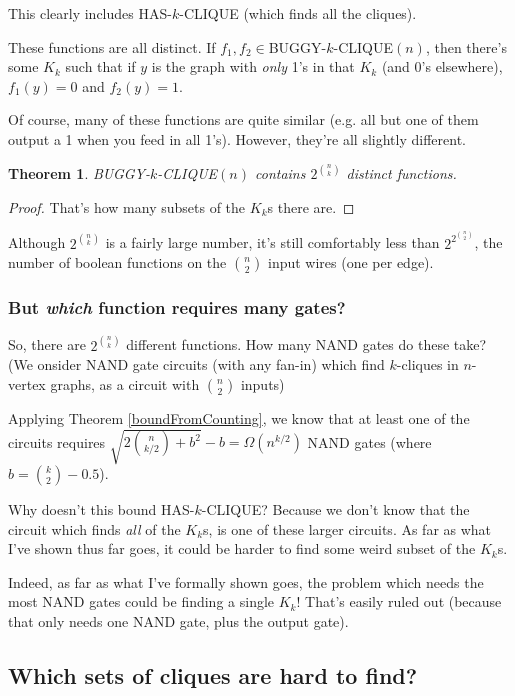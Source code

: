 \documentclass[12pt]{article}
\newtheorem{thm}{Theorem}[section]
\theoremstyle{definition}
\begin{document}
This clearly includes HAS-$k$-CLIQUE (which finds all the cliques).

These functions are all distinct. If $f_1,f_2\in $BUGGY-$k$-CLIQUE$(n)$,
then there's some $K_k$ such that if $y$ is the graph with {\em only}
1's in that $K_k$ (and 0's elsewhere), $f_1(y) = 0$ and $f_2(y) = 1$.

Of course, many of these functions are quite similar (e.g. all but one of them
output a 1 when you feed in all 1's). However, they're all slightly different.

\begin{thm}
\label{buggyDistinct}
BUGGY-$k$-CLIQUE$(n)$ contains $2^{n \choose k}$ distinct functions.
\end{thm}
\begin{proof}
That's how many subsets of the $K_k$s there are.
\end{proof}

Although $2^{n \choose k}$ is a fairly large number,
it's still comfortably less than $2^{2^{n \choose 2}}$, the number of boolean
functions on the ${n \choose 2}$ input wires (one per edge).

\subsubsection{But {\em which} function requires many gates?}

So, there are $2^{n \choose k}$ different functions. 
How many NAND gates do these take?
(We onsider NAND gate circuits (with any fan-in) which find $k$-cliques in $n$-vertex
graphs, as a circuit with $n \choose 2$ inputs)

Applying Theorem
\ref{boundFromCounting}, we know that at least one of the circuits requires
${\sqrt {2 {n \choose {k/2}} + b^2}} - b = \Omega(n^{k/2})$ 
NAND gates (where $b = {k \choose 2} - 0.5$).

Why doesn't this bound HAS-$k$-CLIQUE?
Because we don't know that the circuit which finds {\em all} of the
$K_k$s, is one of these larger circuits. As far as what I've
shown thus far goes, it could be harder to find some weird subset of the $K_k$s.

Indeed, as far as what I've formally shown goes, the problem which needs
the most NAND gates could be finding a single $K_k$! That's easily ruled out
(because that only needs one NAND gate, plus the output gate).

\subsection{Which sets of cliques are hard to find?}
\label{sec:whichCliques}
\end{document}
